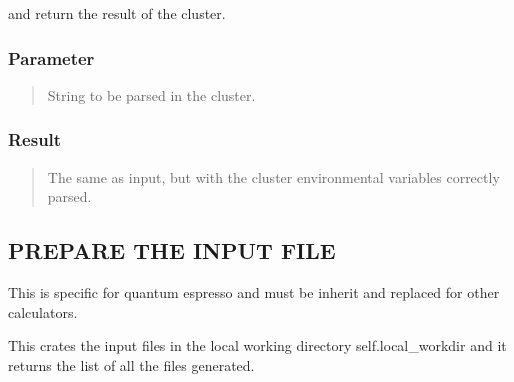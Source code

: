 \documentclass[a4paper,11pt,english]{sphinxmanual}
\begin{document}
\begin{fulllineitems}
\begin{fulllineitems}
\begin{description}
\end{description}

\sphinxAtStartPar
and return the result of the cluster.


\subsubsection{Parameter}
\label{\detokenize{apireference:parameter}}\begin{quote}
\begin{description}
\sphinxAtStartPar
String to be parsed in the cluster.

\end{description}
\end{quote}


\subsubsection{Result}
\label{\detokenize{apireference:id59}}\begin{quote}
\begin{description}
\sphinxAtStartPar
The same as input, but with the cluster environmental variables correctly
parsed.

\end{description}
\end{quote}

\end{fulllineitems}


\begin{fulllineitems}
\label{\detokenize{apireference:sscha.Cluster.Cluster.prepare_input_file}}
\pysigstartsignatures
{}
\pysigstopsignatures

\subsection{PREPARE THE INPUT FILE}
\label{\detokenize{apireference:prepare-the-input-file}}
\sphinxAtStartPar
This is specific for quantum espresso and must be inherit and replaced for 
other calculators.

\sphinxAtStartPar
This crates the input files in the local working directory 
self.local\_workdir and it returns the list of all the files generated.



\end{fulllineitems}
\end{fulllineitems}
\end{document}
